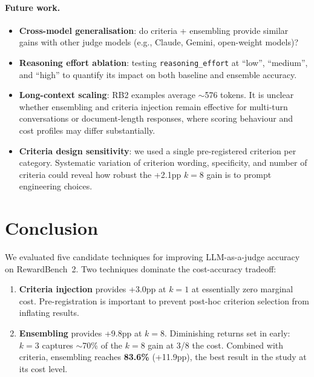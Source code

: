 \documentclass{article}
\begin{document}
\paragraph{Future work.}

\begin{itemize}
  \item \textbf{Cross-model generalisation}: do criteria + ensembling provide similar gains with other judge models (e.g., Claude, Gemini, open-weight models)?
  \item \textbf{Reasoning effort ablation}: testing \texttt{reasoning\_effort} at ``low'', ``medium'', and ``high'' to quantify its impact on both baseline and ensemble accuracy.
  \item \textbf{Long-context scaling}: RB2 examples average ${\sim}$576 tokens. It is unclear whether ensembling and criteria injection remain effective for multi-turn conversations or document-length responses, where scoring behaviour and cost profiles may differ substantially.
  \item \textbf{Criteria design sensitivity}: we used a single pre-registered criterion per category. Systematic variation of criterion wording, specificity, and number of criteria could reveal how robust the +2.1pp $k{=}8$ gain is to prompt engineering choices.
\end{itemize}

\section{Conclusion}
\label{sec:conclusion}

We evaluated five candidate techniques for improving LLM-as-a-judge accuracy on RewardBench~2. Two techniques dominate the cost-accuracy tradeoff:

\begin{enumerate}
  \item \textbf{Criteria injection} provides +3.0pp at $k{=}1$ at essentially zero marginal cost. Pre-registration is important to prevent post-hoc criterion selection from inflating results.
  \item \textbf{Ensembling} provides +9.8pp at $k{=}8$. Diminishing returns set in early: $k{=}3$ captures ${\sim}$70\% of the $k{=}8$ gain at 3/8 the cost. Combined with criteria, ensembling reaches \textbf{83.6\%} (+11.9pp), the best result in the study at its cost level.
\end{enumerate}
\end{document}

